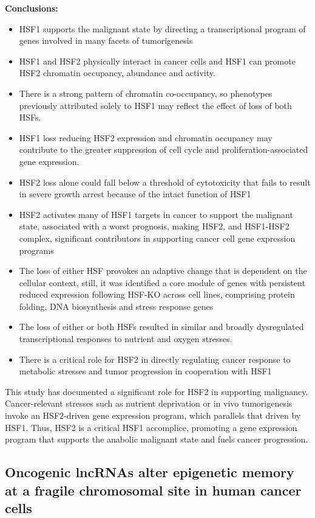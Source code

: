 \textbf{Conclusions:}
\begin{itemize}
\tightlist
\item HSF1 supports the malignant state by directing a transcriptional program of genes involved in many facets of tumorigenesis
\item HSF1 and HSF2 physically interact in cancer cells and HSF1 can promote HSF2 chromatin occupancy, abundance
and activity.
\item There is a strong pattern of chromatin co-occupancy, so phenotypes previously attributed solely to HSF1 may
reflect the effect of loss of both HSFs.
\item HSF1 loss reducing HSF2 expression and chromatin occupancy may contribute to the greater suppression of cell
cycle and proliferation-associated gene expression.
\item HSF2 loss alone could fall below a threshold of cytotoxicity that fails to result in severe growth arrest because of the intact function of HSF1
\item HSF2 activates many of HSF1 targets in cancer to support the malignant state, associated with a worst prognosis, making HSF2, and HSF1-HSF2 complex, significant contributors in supporting cancer cell gene expression programs
\item The loss of either HSF provokes an adaptive change that is dependent on the cellular context, still, it was identified a core module of genes with persistent reduced expression following HSF-KO across cell lines, comprising protein folding, DNA biosynthesis and stress response genes
\item The loss of either or both HSFs resulted in similar and broadly dysregulated transcriptional
responses to nutrient and oxygen stresses.
\item There is a critical role for HSF2 in directly regulating cancer response to metabolic stresses and tumor progression in cooperation with HSF1
\end{itemize}

This study has documented a significant role for HSF2 in supporting malignancy. Cancer-relevant stresses such as nutrient
deprivation or in vivo tumorigenesis invoke an HSF2-driven gene expression program, which parallels that driven by HSF1.
Thus, HSF2 is a critical HSF1 accomplice, promoting a gene expression program that supports the anabolic malignant state
and fuels cancer progression.

\subsection{Oncogenic lncRNAs alter epigenetic memory at a fragile chromosomal site in human cancer cells}

